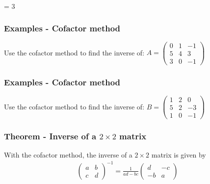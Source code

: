 \documentclass[usenames,dvipsnames,aspectratio=169,10pt]{beamer}
\def \EXAMPLEVERSION {3} %
\numberwithin{equation}{section}
\begin{document}
\ifnum \EXAMPLEVERSION = 3
\begin{frame}
\frametitle{Examples - Cofactor method}

Use the cofactor method to find the inverse of: $A = \begin{pmatrix}
  0 & 1 & -1 \\
  5 & 4 &  3 \\
  3 & 0 & -1
\end{pmatrix}$
\vspace{5cm}
\end{frame}

\begin{frame}
\end{frame}


\begin{frame}
\frametitle{Examples - Cofactor method}

Use the cofactor method to find the inverse of: $B = \begin{pmatrix}
  1 & 2 &  0 \\
  5 & 2 & -3 \\
  1 & 0 & -1
\end{pmatrix}$
\vspace{5cm}
\end{frame}

\begin{frame}
\end{frame}
\fi 



\begin{frame}

\frametitle{Theorem - Inverse of a $2\times 2$ matrix}

With the cofactor method, the inverse of a $2\times 2$ matrix is given by
\begin{align*}
\begin{pmatrix}
a & b \\
c & d
\end{pmatrix}^{-1}
=
\frac{1}{ad - bc}
\begin{pmatrix}
d & -c \\
-b & a
\end{pmatrix}
\end{align*}
\end{frame}
\end{document}
